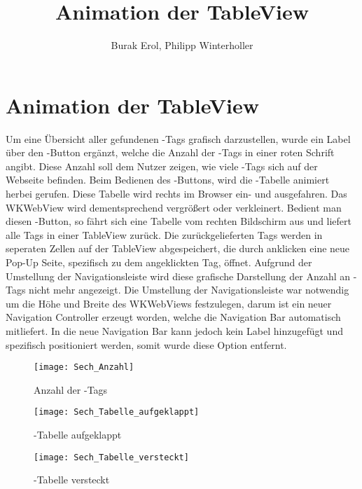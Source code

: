 
\title{Animation der TableView}
\author{Burak Erol, Philipp Winterholler}

\section{Animation der TableView}

Um eine Übersicht aller gefundenen \SEARCH-Tags grafisch darzustellen, wurde ein Label über den \SECH-Button ergänzt, welche die Anzahl der \SEARCH-Tags in einer roten Schrift angibt. Diese Anzahl soll dem Nutzer zeigen, wie viele \SEARCH-Tags sich auf der Webseite befinden. Beim Bedienen des \SECH-Buttons, wird die \SEARCH-Tabelle animiert herbei gerufen. Diese Tabelle wird rechts im Browser ein- und ausgefahren. Das WKWebView wird dementsprechend vergrößert oder verkleinert. Bedient man diesen \SECH-Button, so fährt sich eine Tabelle vom rechten Bildschirm aus und liefert alle Tags in einer TableView zurück. Die zurückgelieferten Tags werden in seperaten Zellen auf der TableView abgespeichert, die durch anklicken eine neue Pop-Up Seite, spezifisch zu dem angeklickten Tag, öffnet. Aufgrund der Umstellung der Navigationsleiste wird diese grafische Darstellung der Anzahl an \SECH-Tags nicht mehr angezeigt. Die Umstellung der Navigationsleiste war notwendig um die Höhe und Breite des WKWebViews festzulegen, darum ist ein neuer Navigation Controller erzeugt worden, welche die Navigation Bar automatisch mitliefert. In die neue Navigation Bar kann jedoch kein Label hinzugefügt und spezifisch positioniert werden, somit wurde diese Option entfernt.

\begin{figure}
	\centering
	\texttt{[image: Sech\_Anzahl]}
	\caption{Anzahl der \SEARCH-Tags}
	\label{fig:Anzahl}
\end{figure}

\pagebreak

\begin{figure}
	\centering
	\texttt{[image: Sech\_Tabelle\_aufgeklappt]}
	\caption{\SEARCH-Tabelle aufgeklappt}
	\label{fig:aufgeklappt}
\end{figure}

\pagebreak

\begin{figure}
	\centering
	\texttt{[image: Sech\_Tabelle\_versteckt]}
	\caption{\SEARCH-Tabelle versteckt}
	\label{fig:}
\end{figure}
